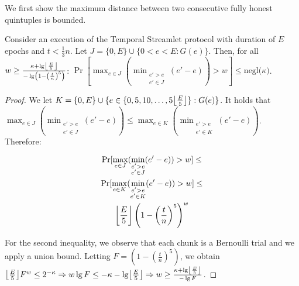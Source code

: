 We first show the maximum distance between two consecutive fully honest quintuples
is bounded.

\begin{lemma} \label{lem:honest-quintuple}
  Consider an execution of the Temporal Streamlet protocol with duration
  of $E$ epochs and $t < \frac{1}{3}n$.
  Let $J = \{0,E\} \cup \{0 < e < E: G(e)\}$.
  Then, for all $w \geq \frac{\kappa + \lg \floor*{\frac{E}{5}}}{- \lg \left(1 - \left(\frac{t}{n}\right)^5\right)}$:
  $\Pr [\max_{e \in J}(\min_{\substack{e' > e \\ e' \in J}}(e' - e)) > w] \leq \text{negl($\kappa$)}$.
\end{lemma}
\begin{proof}
  We let $K = \{0, E\} \cup \{e \in \{0, 5, 10 ,\ldots, 5\floor*{\frac{E}{5}}\}: G(e)\}$.
  It holds that
  $\max_{e \in J}(\min_{\substack{e' > e \\ e' \in J}}(e' - e)) \leq \max_{e \in K}(\min_{\substack{e' > e \\ e' \in K}}(e' - e))$.
  Therefore:

  \begin{gather*}
      \Pr [\max_{e \in J}(\min_{\substack{e' > e \\ e' \in J}}(e' - e)) > w] \leq \\
      \Pr [\max_{e \in K}(\min_{\substack{e' > e \\ e' \in K}}(e' - e)) > w] \leq \\
      \floor*{\frac{E}{5}} \left(1 - \left(\frac{t}{n}\right)^5\right)^w
  \end{gather*}

  For the second inequality, we observe that each chunk is a Bernoulli trial and we
  apply a union bound.
  Letting $F = \left(1 - \left(\frac{t}{n}\right)^5\right)$, we obtain
  $\floor*{\frac{E}{5}} F^w \leq 2^{-\kappa} \Rightarrow
   w \lg F \leq -\kappa - \lg \floor*{\frac{E}{5}} \Rightarrow
   w \geq \frac{\kappa + \lg \floor*{\frac{E}{5}}}{- \lg F}
  $.
  \Qed
\end{proof}


